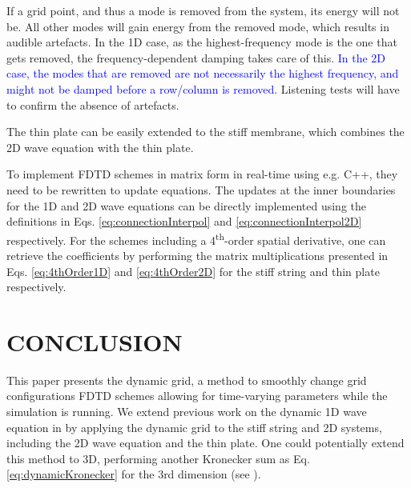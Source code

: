 \documentclass[fleqn]{jaes}
\def\SWcomment[#1]{\textcolor{blue}{#1}}
\begin{document}
If a grid point, and thus a mode is removed from the system, its energy will not be. All other modes will gain energy from the removed mode, which results in audible artefacts. In the 1D case, as the highest-frequency mode is the one that gets removed, the frequency-dependent damping takes care of this. \SWcomment[In the 2D case, the modes that are removed are not necessarily the highest frequency, and might not be damped before a row/column is removed.] Listening tests will have to confirm the absence of artefacts.


The thin plate can be easily extended to the stiff membrane, which combines the 2D wave equation with the thin plate.

To implement FDTD schemes in matrix form in real-time using e.g. C++, they need to be rewritten to update equations. The updates at the inner boundaries for the 1D and 2D wave equations can be directly implemented using the definitions in Eqs. \eqref{eq:connectionInterpol} and \eqref{eq:connectionInterpol2D} respectively. For the schemes including a 4\textsuperscript{th}-order spatial derivative, one can retrieve the coefficients by performing the matrix multiplications presented in Eqs. \eqref{eq:4thOrder1D} and \eqref{eq:4thOrder2D} for the stiff string and thin plate respectively. 





\section{CONCLUSION}\label{sec:conclusion}
This paper presents the dynamic grid, a method to smoothly change grid configurations FDTD schemes allowing for time-varying parameters while the simulation is running. We extend previous work on the dynamic 1D wave equation in \cite{Willemsen2021a} by applying the dynamic grid to the stiff string and 2D systems, including the 2D wave equation and the thin plate. One could potentially extend this method to 3D, performing another Kronecker sum as Eq. \eqref{eq:dynamicKronecker} for the 3rd dimension (see \cite{Hamilton2016}).

\end{document}
